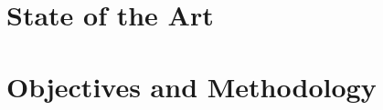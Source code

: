 \documentclass[12pt, a4paper]{article}
\begin{document}
\section{State of the Art}

\section{Objectives and Methodology}
\end{document}
